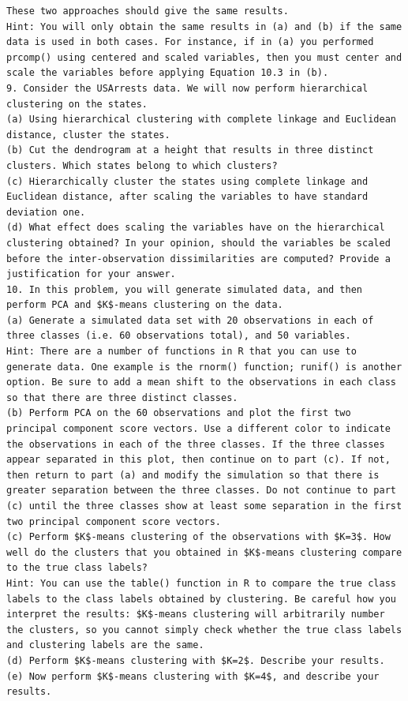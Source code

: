 \documentclass[10pt]{article}
\begin{document}
\begin{verbatim}
These two approaches should give the same results.
Hint: You will only obtain the same results in (a) and (b) if the same data is used in both cases. For instance, if in (a) you performed prcomp() using centered and scaled variables, then you must center and scale the variables before applying Equation 10.3 in (b).
9. Consider the USArrests data. We will now perform hierarchical clustering on the states.
(a) Using hierarchical clustering with complete linkage and Euclidean distance, cluster the states.
(b) Cut the dendrogram at a height that results in three distinct clusters. Which states belong to which clusters?
(c) Hierarchically cluster the states using complete linkage and Euclidean distance, after scaling the variables to have standard deviation one.
(d) What effect does scaling the variables have on the hierarchical clustering obtained? In your opinion, should the variables be scaled before the inter-observation dissimilarities are computed? Provide a justification for your answer.
10. In this problem, you will generate simulated data, and then perform PCA and $K$-means clustering on the data.
(a) Generate a simulated data set with 20 observations in each of three classes (i.e. 60 observations total), and 50 variables.
Hint: There are a number of functions in R that you can use to generate data. One example is the rnorm() function; runif() is another option. Be sure to add a mean shift to the observations in each class so that there are three distinct classes.
(b) Perform PCA on the 60 observations and plot the first two principal component score vectors. Use a different color to indicate the observations in each of the three classes. If the three classes appear separated in this plot, then continue on to part (c). If not, then return to part (a) and modify the simulation so that there is greater separation between the three classes. Do not continue to part (c) until the three classes show at least some separation in the first two principal component score vectors.
(c) Perform $K$-means clustering of the observations with $K=3$. How well do the clusters that you obtained in $K$-means clustering compare to the true class labels?
Hint: You can use the table() function in R to compare the true class labels to the class labels obtained by clustering. Be careful how you interpret the results: $K$-means clustering will arbitrarily number the clusters, so you cannot simply check whether the true class labels and clustering labels are the same.
(d) Perform $K$-means clustering with $K=2$. Describe your results.
(e) Now perform $K$-means clustering with $K=4$, and describe your results.

\end{verbatim}
\end{document}
